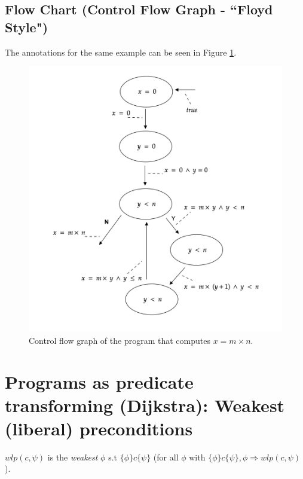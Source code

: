 \subsection{Flow Chart (Control Flow Graph - ``Floyd Style")}
    The annotations for the same example can be seen in Figure \ref{cf16}.
\begin{figure}[h!]
    \begin{center}
    \includegraphics[width=\linewidth]{images/cf16.png}
    \caption{Control flow graph of the program that computes $x = m \times n$.}
    \end{center}
    \label{cf16}
\end{figure}

\pagebreak

\section{Programs as predicate transforming (Dijkstra): Weakest (liberal) preconditions}
\begin{definition} $wlp(c, \psi)$ is the \textit{weakest} $\phi$ s.t $\{\phi\} c \{\psi\}$ (for all $\phi$ with $\{\phi\} c\{\psi\}, \phi \Rightarrow wlp(c, \psi)$).
\end{definition}

